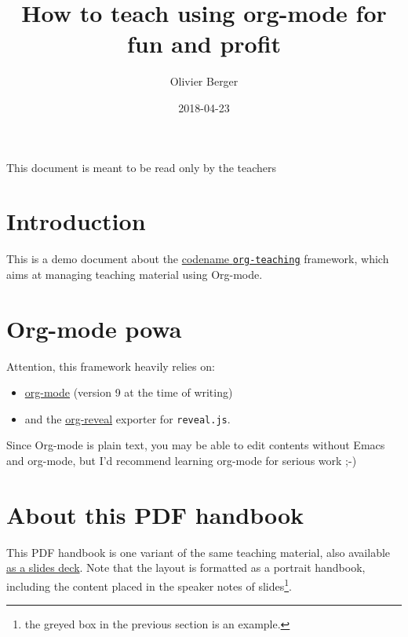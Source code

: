 \documentclass[a4paper]{article}
\author{Olivier Berger}
\date{2018-04-23}
\title{How to teach using org-mode for fun and profit}
\newenvironment{NOTES}{\begin{lrbox}{\mybox}\begin{minipage}{0.9\textwidth}\begin{shaded}}{\end{shaded}\end{minipage}\end{lrbox}\fbox{\usebox{\mybox}}}
\begin{document}
\maketitle
\setcounter{tocdepth}{2}
\tableofcontents

\begin{ABSTRACT}
\begin{shaded}
This document is meant to be read only by the teachers
\end{shaded}
\end{ABSTRACT}

\section{Introduction}
\label{sec:org6b5490a}

This is a demo document about the
\href{http://www-public.tem-tsp.eu/\~berger\_o/org-teaching/}{codename \texttt{org-teaching}} 
framework, which aims at managing teaching material using Org-mode.

\section{Org-mode powa}
\label{sec:orga0ef22e}

Attention, this framework heavily relies on: 

\begin{itemize}
\item \href{http://orgmode.org/}{org-mode} (version 9 at the time of writing)
\item and the \href{https://github.com/yjwen/org-reveal/}{org-reveal} exporter for \texttt{reveal.js}.
\end{itemize}

\begin{NOTES}
Since Org-mode is plain text, you may be able to edit contents without
Emacs and org-mode, but I'd recommend learning org-mode for serious
work ;-)
\end{NOTES}

\section{About this PDF handbook}
\label{sec:org70016e9}

This PDF handbook is one variant of the same teaching material, also
available \href{./slides.html}{as a slides deck}. Note that the layout is
formatted as a portrait handbook, including the content placed in the
speaker notes of slides\footnote{the greyed box in the previous section is an example.}.
\end{document}
